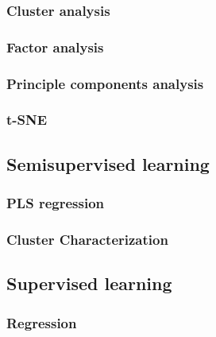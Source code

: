 \documentclass[
]{book}
\begin{document}
\hypertarget{cluster-analysis}{%
\subsubsection{Cluster analysis}\label{cluster-analysis}}

\hypertarget{factor-analysis}{%
\subsubsection{Factor analysis}\label{factor-analysis}}

\hypertarget{principle-components-analysis}{%
\subsubsection{Principle components analysis}\label{principle-components-analysis}}

\hypertarget{t-sne}{%
\subsubsection{t-SNE}\label{t-sne}}

\hypertarget{semisupervised-learning}{%
\subsection{Semisupervised learning}\label{semisupervised-learning}}

\hypertarget{pls-regression}{%
\subsubsection{PLS regression}\label{pls-regression}}

\hypertarget{cluster-characterization}{%
\subsubsection{Cluster Characterization}\label{cluster-characterization}}

\hypertarget{supervised-learning}{%
\subsection{Supervised learning}\label{supervised-learning}}

\hypertarget{regression}{%
\subsubsection{Regression}\label{regression}}
\end{document}
